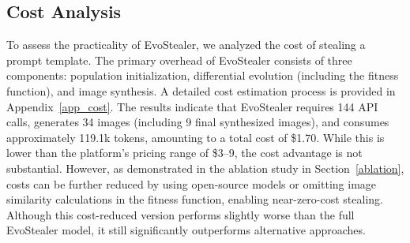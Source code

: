 % 




\subsection{Cost Analysis}
% 

To assess the practicality of EvoStealer, we analyzed the cost of stealing a prompt template. The primary overhead of EvoStealer consists of three components: population initialization, differential evolution (including the fitness function), and image synthesis. A detailed cost estimation process is provided in Appendix~\ref{app_cost}. The results indicate that EvoStealer requires 144 API calls, generates 34 images (including 9 final synthesized images), and consumes approximately 119.1k tokens, amounting to a total cost of \$1.70. While this is lower than the platform’s pricing range of \$3–9, the cost advantage is not substantial. However, as demonstrated in the ablation study in Section~\ref{ablation}, costs can be further reduced by using open-source models or omitting image similarity calculations in the fitness function, enabling near-zero-cost stealing. Although this cost-reduced version performs slightly worse than the full EvoStealer model, it still significantly outperforms alternative approaches.
